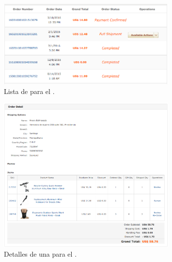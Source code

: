 
\begin{figure}[H]
	\centering
	\includegraphics[width=0.8\textwidth]{figuras/orders/examples/dx_list_orders.png}
	\caption{Lista de \ordersEF para el \websiteINT \dealextremeNAME.}
	\label{figure:apendice:orders:example:dx_list_orders}
\end{figure}

\begin{figure}[H]
	\centering
	\includegraphics[width=0.8\textwidth]{figuras/orders/examples/dx_order_detail.png}
	\caption{Detalles de una \orderEF para el \websiteINT \dealextremeNAME.}
	\label{figure:apendice:orders:example:dx_order_detail}
\end{figure}